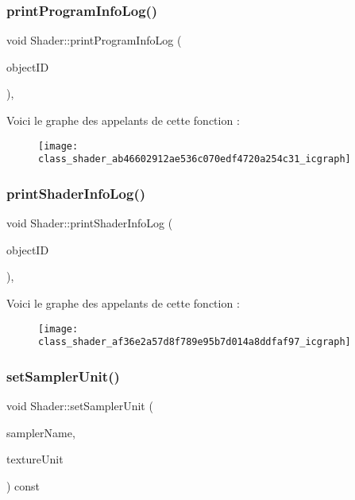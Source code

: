 \subsubsection{\texorpdfstring{print\+Program\+Info\+Log()}{printProgramInfoLog()}}
{\footnotesize\ttfamily void Shader\+::print\+Program\+Info\+Log (\begin{DoxyParamCaption}\item[{G\+Luint}]{object\+ID }\end{DoxyParamCaption})\hspace{0.3cm}{\ttfamily [static]}, {\ttfamily [protected]}}

Voici le graphe des appelants de cette fonction \+:\nopagebreak
\begin{figure}[H]
\begin{center}
\leavevmode
\texttt{[image: class\_shader\_ab46602912ae536c070edf4720a254c31\_icgraph]}
\end{center}
\end{figure}
\mbox{\label{class_shader_af36e2a57d8f789e95b7d014a8ddfaf97}} 
\subsubsection{\texorpdfstring{print\+Shader\+Info\+Log()}{printShaderInfoLog()}}
{\footnotesize\ttfamily void Shader\+::print\+Shader\+Info\+Log (\begin{DoxyParamCaption}\item[{G\+Luint}]{object\+ID }\end{DoxyParamCaption})\hspace{0.3cm}{\ttfamily [static]}, {\ttfamily [protected]}}

Voici le graphe des appelants de cette fonction \+:\nopagebreak
\begin{figure}[H]
\begin{center}
\leavevmode
\texttt{[image: class\_shader\_af36e2a57d8f789e95b7d014a8ddfaf97\_icgraph]}
\end{center}
\end{figure}
\mbox{\label{class_shader_ae6ebc266e4706be4b040fe23aced651a}} 
\subsubsection{\texorpdfstring{set\+Sampler\+Unit()}{setSamplerUnit()}}
{\footnotesize\ttfamily void Shader\+::set\+Sampler\+Unit (\begin{DoxyParamCaption}\item[{const char $\ast$}]{sampler\+Name,  }\item[{int}]{texture\+Unit }\end{DoxyParamCaption}) const}

